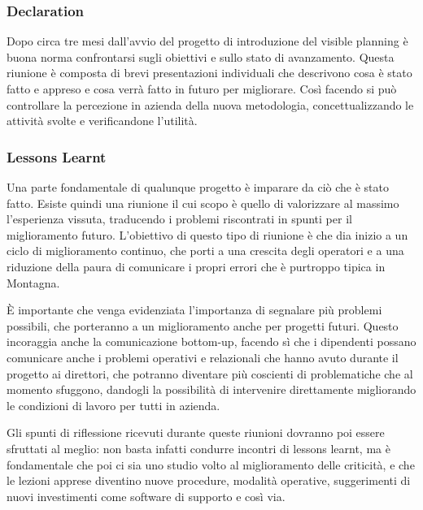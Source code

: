 \begin{multicols}{2}
	\subsubsection{Declaration}
	Dopo circa tre mesi dall’avvio del progetto di introduzione del visible planning è buona norma confrontarsi sugli obiettivi e sullo stato di avanzamento. Questa riunione è composta di brevi presentazioni individuali che descrivono cosa è stato fatto e appreso e cosa verrà fatto in futuro per migliorare. Così facendo si può controllare la percezione in azienda della nuova metodologia, concettualizzando le attività svolte e verificandone l’utilità.

	\subsubsection{Lessons Learnt}
	Una parte fondamentale di qualunque progetto è imparare da ciò che è stato fatto. Esiste quindi una riunione il cui scopo è quello di valorizzare al massimo l’esperienza vissuta, traducendo i problemi riscontrati in spunti per il miglioramento futuro. L’obiettivo di questo tipo di riunione è che dia inizio a un ciclo di miglioramento continuo, che porti a una crescita degli operatori e a una riduzione della paura di comunicare i propri errori che è purtroppo tipica in Montagna.

	È importante che venga evidenziata l’importanza di segnalare più problemi possibili, che porteranno a un miglioramento anche per progetti futuri. Questo incoraggia anche la comunicazione bottom-up, facendo sì che i dipendenti possano comunicare anche i problemi operativi e relazionali che hanno avuto durante il progetto ai direttori, che potranno diventare più coscienti di problematiche che al momento sfuggono, dandogli la possibilità di intervenire direttamente migliorando le condizioni di lavoro per tutti in azienda.

	Gli spunti di riflessione ricevuti durante queste riunioni dovranno poi essere sfruttati al meglio: non basta infatti condurre incontri di lessons learnt, ma è fondamentale che poi ci sia uno studio volto al miglioramento delle criticità, e che le lezioni apprese diventino nuove procedure, modalità operative, suggerimenti di nuovi investimenti come software di supporto e così via.

\end{multicols}


